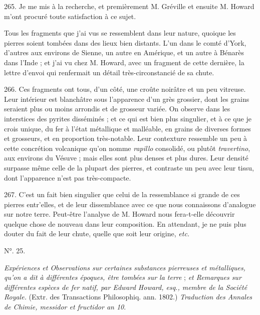 \documentclass[a4paper, 11pt, oneside, polutonikogreek, french]{article}
\begin{document}
265. Je me mis à la recherche, et premièrement M. Gréville et ensuite M. Howard m'ont procuré toute satisfaction à ce sujet.

Tous les fragments que j'ai vus se ressemblent dans leur nature, quoique les pierres soient tombées dans des lieux bien distants. L'un dans le comté d'York, d'autres aux environs de Sienne, un autre en Amérique, et un autre à Bénarès dans l'Inde ; et j'ai vu chez M. Howard, avec un fragment de cette dernière, la lettre d'envoi qui renfermait un détail très-circonstancié de sa chute.

266. Ces fragments ont tous, d'un côté, une croûte noirâtre et un peu vitreuse. Leur intérieur est blanchâtre sous l'apparence d'un grès grossier, dont les grains seraient plus ou moins arrondis et de grosseur variée. On observe dans les interstices des pyrites disséminés ; et ce qui est bien plus singulier, et à ce que je crois unique, du fer à l'état métallique et malléable, en grains de diverses formes et grosseurs, et en proportion très-notable. Leur contexture ressemble un peu à cette concrétion volcanique qu'on nomme \emph{rapillo} consolidé, ou plutôt \emph{travertino}, aux environs du Vésuve ; mais elles sont plus denses et plus dures. Leur densité surpasse même celle de la plupart des pierres, et contraste un peu avec leur tissu, dont l'apparence n'est pas très-compacte.

267. C'est un fait bien singulier que celui de la ressemblance si grande de ces pierres entr'elles, et de leur dissemblance avec ce que nous connaissons d'analogue sur notre terre. Peut-être l'analyse de M. Howard nous fera-t-elle découvrir quelque chose de nouveau dans leur composition. En attendant, je ne puis plus douter du fait de leur chute, quelle que soit leur origine, \emph{etc.}

\begin{center}
N°. 25.
\end{center}

\begin{center}
\emph{Expériences et Observations sur certaines substances pierreuses et métalliques, qu'on a dit à différentes époques, être tombées sur la terre} ; \emph{et Remarques sur différentes espèces de fer natif, par Edward Howard, esq., membre de la Société Royale.} (Extr. des Transactions Philosophiq. ann. 1802.) \emph{Traduction des Annales de Chimie, messidor et fructidor an 10}.
\end{center}
\end{document}
